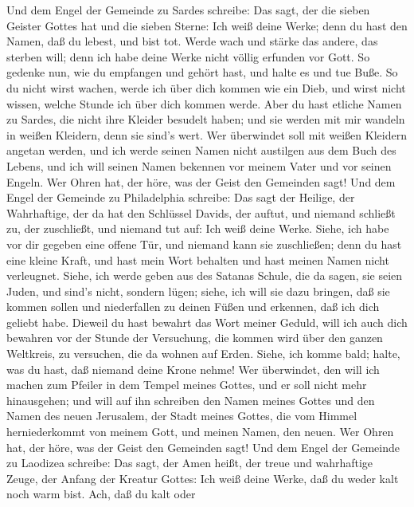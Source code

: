  Und dem Engel der Gemeinde zu Sardes schreibe: Das sagt,
der die sieben Geister Gottes hat und die sieben Sterne: Ich weiß deine
Werke; denn du hast den Namen, daß du lebest, und bist tot. 
Werde wach und stärke das andere, das sterben will; denn ich habe deine
Werke nicht völlig erfunden vor Gott.  So gedenke nun, wie
du empfangen und gehört hast, und halte es und tue Buße. So du nicht
wirst wachen, werde ich über dich kommen wie ein Dieb, und wirst nicht
wissen, welche Stunde ich über dich kommen werde.  Aber du
hast etliche Namen zu Sardes, die nicht ihre Kleider besudelt haben; und
sie werden mit mir wandeln in weißen Kleidern, denn sie sind's wert.
 Wer überwindet soll mit weißen Kleidern angetan werden, und
ich werde seinen Namen nicht austilgen aus dem Buch des Lebens, und ich
will seinen Namen bekennen vor meinem Vater und vor seinen Engeln.
 Wer Ohren hat, der höre, was der Geist den Gemeinden sagt!
 Und dem Engel der Gemeinde zu Philadelphia schreibe: Das
sagt der Heilige, der Wahrhaftige, der da hat den Schlüssel Davids, der
auftut, und niemand schließt zu, der zuschließt, und niemand tut auf:
 Ich weiß deine Werke. Siehe, ich habe vor dir gegeben eine
offene Tür, und niemand kann sie zuschließen; denn du hast eine kleine
Kraft, und hast mein Wort behalten und hast meinen Namen nicht
verleugnet.  Siehe, ich werde geben aus des Satanas Schule,
die da sagen, sie seien Juden, und sind's nicht, sondern lügen; siehe,
ich will sie dazu bringen, daß sie kommen sollen und niederfallen zu
deinen Füßen und erkennen, daß ich dich geliebt habe. 
Dieweil du hast bewahrt das Wort meiner Geduld, will ich auch dich
bewahren vor der Stunde der Versuchung, die kommen wird über den ganzen
Weltkreis, zu versuchen, die da wohnen auf Erden.  Siehe,
ich komme bald; halte, was du hast, daß niemand deine Krone nehme!
 Wer überwindet, den will ich machen zum Pfeiler in dem
Tempel meines Gottes, und er soll nicht mehr hinausgehen; und will auf
ihn schreiben den Namen meines Gottes und den Namen des neuen Jerusalem,
der Stadt meines Gottes, die vom Himmel herniederkommt von meinem Gott,
und meinen Namen, den neuen.  Wer Ohren hat, der höre, was
der Geist den Gemeinden sagt!  Und dem Engel der Gemeinde
zu Laodizea schreibe: Das sagt, der Amen heißt, der treue und
wahrhaftige Zeuge, der Anfang der Kreatur Gottes:  Ich weiß
deine Werke, daß du weder kalt noch warm bist. Ach, daß du kalt oder
